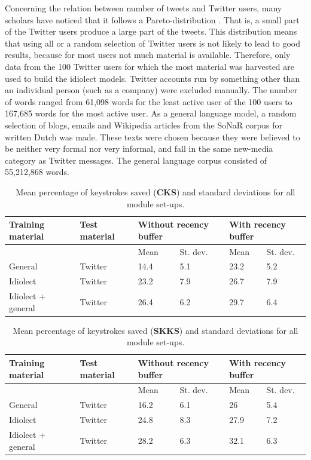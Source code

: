 \documentclass[11pt]{article}
\begin{document}
Concerning the relation between number of tweets and Twitter users, many scholars have noticed that it follows a Pareto-distribution \cite{heil+09,asur+10,rui+12}. That is, a small part of the Twitter users produce a large part of the tweets. 
This distribution means that using all or a random selection of Twitter users is not likely to lead to good results, because for most users not much material is available. Therefore, only data from the 100 Twitter users for which the most material was harvested are used to build the idiolect models. Twitter accounts run by something other than an individual person (such as a company) were excluded manually. The number of words ranged from 61,098 words for the least active user of the 100 users to 167,685 words for the most active user. As a general language model, a random selection of blogs, emails and Wikipedia articles from the SoNaR corpus for written Dutch \cite{oostdijk+13} was made. These texts were chosen because they were believed to be neither very formal nor very informal, and fall in the same new-media category as Twitter messages. The general language corpus consisted of 55,212,868 words.

\begin{table}[htb] 
\centering
\begin{tabular}{ll|llll} 
Training material&Test material&\multicolumn{2}{l}{Without recency buffer}&\multicolumn{2}{l}{With recency buffer}\\
\hline
&&Mean&St. dev.&Mean&St. dev.\\
General&Twitter&14.4&5.1&23.2&5.2\\
Idiolect&Twitter&23.2&7.9&26.7&7.9\\
Idiolect + general &Twitter&26.4&6.2&29.7&6.4\\
\end{tabular} 
\caption{Mean percentage of keystrokes saved (\textbf{CKS}) and standard deviations for all module set-ups.} \label{twitter_results_cks}
\end{table}

\begin{table}[htb] 
\centering
\begin{tabular}{ll|llll} 
Training material&Test material&\multicolumn{2}{l}{Without recency buffer}&\multicolumn{2}{l}{With recency buffer}\\
\hline
&&Mean&St. dev.&Mean&St. dev.\\
General&Twitter&16.2&6.1&26&5.4\\
Idiolect&Twitter&24.8&8.3&27.9&7.2\\
Idiolect + general&Twitter&28.2&6.3&32.1&6.3\\
\end{tabular} 
\caption{Mean percentage of keystrokes saved (\textbf{SKKS}) and standard deviations for all module set-ups.} \label{twitter_results_skks}
\end{table}
\end{document}
